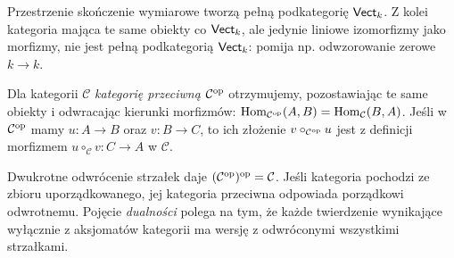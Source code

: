 \begin{przyklad}
Przestrzenie skończenie wymiarowe tworzą pełną podkategorię $\mathsf{Vect}_k$. Z kolei kategoria mająca te same obiekty co $\mathsf{Vect}_k$, ale jedynie liniowe izomorfizmy jako morfizmy, nie jest pełną podkategorią $\mathsf{Vect}_k$: pomija np. odwzorowanie zerowe $k\to k$.
\end{przyklad}

\begin{definicja}\label{def:op}
Dla kategorii $\mathcal C$ \emph{kategorię przeciwną} $\mathcal C^{\mathrm{op}}$ otrzymujemy, pozostawiając te same obiekty i odwracając kierunki morfizmów: $\operatorname{Hom}_{\mathcal C^{\mathrm{op}}}(A,B)=\operatorname{Hom}_{\mathcal C}(B,A)$. Jeśli w $\mathcal C^{\mathrm{op}}$ mamy $u:A\to B$ oraz $v:B\to C$, to ich złożenie $v\circ_{\mathcal C^{\mathrm{op}}}u$ jest z definicji morfizmem $u\circ_{\mathcal C}v:C\to A$ w $\mathcal C$.
\end{definicja}

\begin{uwaga}
Dwukrotne odwrócenie strzałek daje $(\mathcal C^{\mathrm{op}})^{\mathrm{op}}=\mathcal C$. Jeśli kategoria pochodzi ze zbioru uporządkowanego, jej kategoria przeciwna odpowiada porządkowi odwrotnemu. Pojęcie \emph{dualności} polega na tym, że każde twierdzenie wynikające wyłącznie z aksjomatów kategorii ma wersję z odwróconymi wszystkimi strzałkami.
\end{uwaga}

